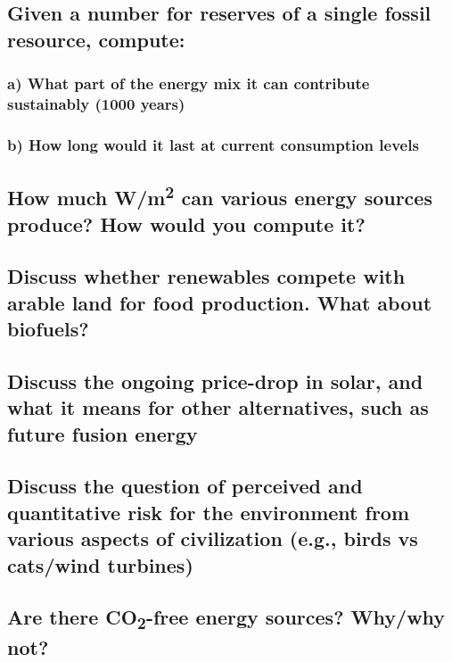 \subsection{Given a number for reserves of a single fossil resource, compute:}
\subsubsection{a) What part of the energy mix it can contribute sustainably (1000 years)}
\solutionblock{}

\subsubsection{b) How long would it last at current consumption levels}
\solutionblock{}

\subsection{How much W/m\textsuperscript{2} can various energy sources produce? How would you compute it?}
\solutionblock{}

\subsection{Discuss whether renewables compete with arable land for food production. What about biofuels?}
\solutionblock{}

\subsection{Discuss the ongoing price-drop in solar, and what it means for other alternatives, such as future fusion energy}
\solutionblock{}

\subsection{Discuss the question of perceived and quantitative risk for the environment from various aspects of civilization (e.g., birds vs cats/wind turbines)}
\solutionblock{}

\subsection{Are there CO\textsubscript{2}-free energy sources? Why/why not?}
\solutionblock{}
